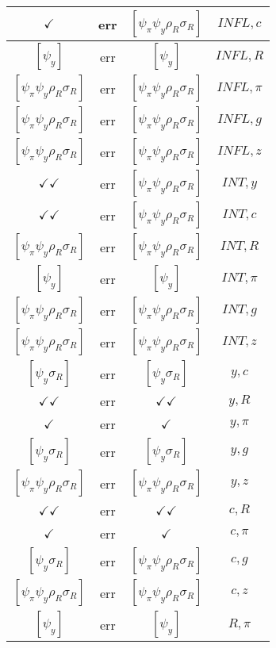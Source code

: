 \documentclass[a4paper,10pt]{article}
\begin{document}
\begin{longtable}{|c|c|c|c|}
\hline
$\checkmark$ & err & $[\psi_\pi \psi_y \rho_R \sigma_R ]$ & ${INFL},{c}$ \\
\hline
$[\psi_y ]$ & err & $[\psi_y ]$ & ${INFL},{R}$ \\
\hline
$[\psi_\pi \psi_y \rho_R \sigma_R ]$ & err & $[\psi_\pi \psi_y \rho_R \sigma_R ]$ & ${INFL},{\pi}$ \\
\hline
$[\psi_\pi \psi_y \rho_R \sigma_R ]$ & err & $[\psi_\pi \psi_y \rho_R \sigma_R ]$ & ${INFL},{g}$ \\
\hline
$[\psi_\pi \psi_y \rho_R \sigma_R ]$ & err & $[\psi_\pi \psi_y \rho_R \sigma_R ]$ & ${INFL},{z}$ \\
\hline
$\checkmark\checkmark$ & err & $[\psi_\pi \psi_y \rho_R \sigma_R ]$ & ${INT},{y}$ \\
\hline
$\checkmark\checkmark$ & err & $[\psi_\pi \psi_y \rho_R \sigma_R ]$ & ${INT},{c}$ \\
\hline
$[\psi_\pi \psi_y \rho_R \sigma_R ]$ & err & $[\psi_\pi \psi_y \rho_R \sigma_R ]$ & ${INT},{R}$ \\
\hline
$[\psi_y ]$ & err & $[\psi_y ]$ & ${INT},{\pi}$ \\
\hline
$[\psi_\pi \psi_y \rho_R \sigma_R ]$ & err & $[\psi_\pi \psi_y \rho_R \sigma_R ]$ & ${INT},{g}$ \\
\hline
$[\psi_\pi \psi_y \rho_R \sigma_R ]$ & err & $[\psi_\pi \psi_y \rho_R \sigma_R ]$ & ${INT},{z}$ \\
\hline
$[\psi_y \sigma_R ]$ & err & $[\psi_y \sigma_R ]$ & ${y},{c}$ \\
\hline
$\checkmark\checkmark$ & err & $\checkmark\checkmark$ & ${y},{R}$ \\
\hline
$\checkmark$ & err & $\checkmark$ & ${y},{\pi}$ \\
\hline
$[\psi_y \sigma_R ]$ & err & $[\psi_y \sigma_R ]$ & ${y},{g}$ \\
\hline
$[\psi_\pi \psi_y \rho_R \sigma_R ]$ & err & $[\psi_\pi \psi_y \rho_R \sigma_R ]$ & ${y},{z}$ \\
\hline
$\checkmark\checkmark$ & err & $\checkmark\checkmark$ & ${c},{R}$ \\
\hline
$\checkmark$ & err & $\checkmark$ & ${c},{\pi}$ \\
\hline
$[\psi_y \sigma_R ]$ & err & $[\psi_\pi \psi_y \rho_R \sigma_R ]$ & ${c},{g}$ \\
\hline
$[\psi_\pi \psi_y \rho_R \sigma_R ]$ & err & $[\psi_\pi \psi_y \rho_R \sigma_R ]$ & ${c},{z}$ \\
\hline
$[\psi_y ]$ & err & $[\psi_y ]$ & ${R},{\pi}$ \\

\end{longtable}
\end{document}
